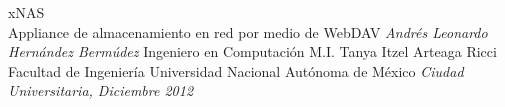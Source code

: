 \documentclass[dvips,letterpaper,12pt]{report}
\begin{document}


\thesistitle
	{xNAS \\
	 Appliance de almacenamiento en red por medio de WebDAV}
	{\emph{Andr\'{e}s Leonardo Hern\'{a}ndez Berm\'{u}dez}}
	{Ingeniero en Computaci\'{o}n}
	{M.I. Tanya Itzel Arteaga Ricci}
	{Facultad de Ingenier\'{i}a}
	{Universidad Nacional Aut\'{o}noma de M\'{e}xico}
	{\emph{Ciudad Universitaria, Diciembre 2012}}







	
% 
% 
% 
% 
% 
% 



\appendix

\end{document}
